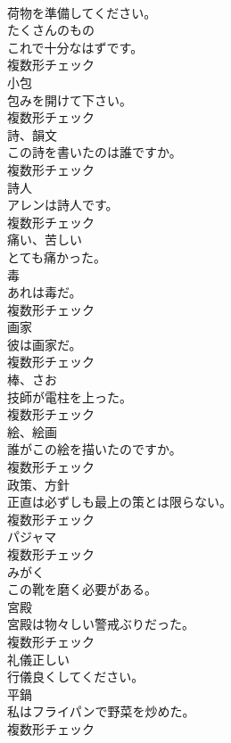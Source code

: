 \documentclass[8pt]{extreport}
\begin{document}
\begin{CJK}{UTF8}{min}
\\	荷物を準備してください。	
\\	[名詞]	たくさんのもの	
\\	これで十分なはずです。	
\\	複数形チェック
\\	[名詞]	小包	
\\	包みを開けて下さい。	
\\	複数形チェック
\\	[名詞]	詩、韻文	
\\	この詩を書いたのは誰ですか。	
\\	複数形チェック
\\	[名詞]	詩人	
\\	アレンは詩人です。	
\\	複数形チェック
\\	[形容詞]	痛い、苦しい	
\\	とても痛かった。	
\\	[名詞]	毒	
\\	あれは毒だ。	
\\	複数形チェック
\\	[名詞]	画家	
\\	彼は画家だ。	
\\	複数形チェック
\\	[名詞]	棒、さお	
\\	技師が電柱を上った。	
\\	複数形チェック
\\	[名詞]	絵、絵画	
\\	誰がこの絵を描いたのですか。	
\\	複数形チェック
\\	[名詞]	政策、方針	
\\	正直は必ずしも最上の策とは限らない。	
\\	複数形チェック
\\	[名詞]	パジャマ	
\\	複数形チェック
\\	[動詞]	みがく	
\\	この靴を磨く必要がある。	
\\	[名詞]	宮殿	
\\	宮殿は物々しい警戒ぶりだった。	
\\	複数形チェック
\\	[形容詞]	礼儀正しい	
\\	行儀良くしてください。	
\\	[名詞]	平鍋	
\\	私はフライパンで野菜を炒めた。	
\\	複数形チェック

\end{CJK}
\end{document}
